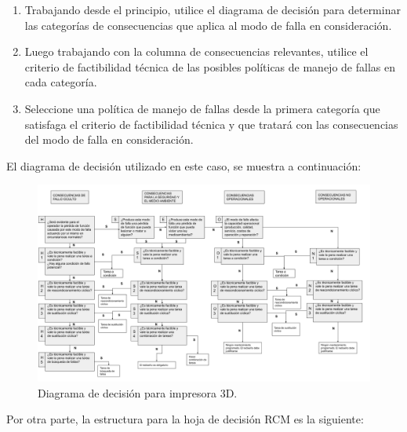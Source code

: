 \begin{enumerate}
\item Trabajando desde el principio, utilice el diagrama de decisión para determinar las categorías de consecuencias que aplica al modo de falla en consideración.
\item Luego trabajando con la columna de consecuencias relevantes, utilice el criterio de factibilidad técnica de las posibles políticas de manejo de fallas en cada categoría.
\item Seleccione una política de manejo de fallas desde la primera categoría que satisfaga el criterio de factibilidad técnica y que tratará con las consecuencias del modo de falla en consideración.

\end{enumerate}

El diagrama de decisión utilizado en este caso, se muestra a continuación:

\begin{figure}[H]
\centering
\includegraphics[scale=0.45, angle=90]{images/decisionrcm.png}
\caption{Diagrama de decisión para impresora 3D.}
\end{figure}


Por otra parte, la estructura para la hoja de decisión RCM es la siguiente:



